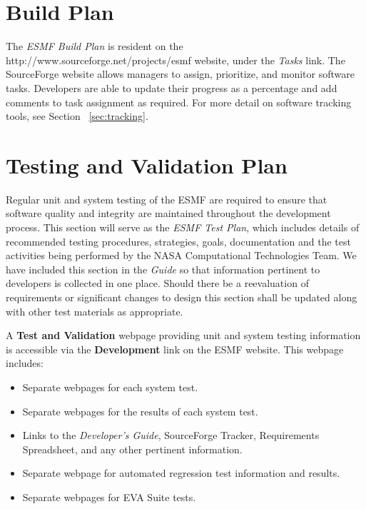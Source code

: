 
\section{Build Plan}
\label{sec:build}

The {\it ESMF Build Plan} is resident on the 
{http://www.sourceforge.net/projects/esmf} website, under the 
{\it Tasks} link. The SourceForge website allows managers to
assign, prioritize, and monitor software tasks. Developers are
able to update their progress as a percentage and add comments to
task assignment as required. For more detail on software
tracking tools, see Section ~\ref{sec:tracking}.

\section{Testing and Validation Plan}
\label{sec:testing}

Regular unit and system testing of the ESMF are required to ensure that 
software quality and integrity are maintained throughout 
the development process.  This section will serve as 
the {\it ESMF Test Plan}, which includes details 
of recommended testing procedures, strategies, goals, documentation 
and the test activities being performed by the NASA Computational 
Technologies Team.
We have included this section in the {\it Guide} 
so that information pertinent to developers is collected in one 
place.  Should there be a reevaluation of requirements or significant 
changes to design this section shall be updated along with other 
test materials as appropriate.

A {\bf Test and Validation} webpage providing unit and system testing 
information is accessible via the {\bf Development} link on the ESMF 
website. This webpage includes:
\begin{itemize}
\item Separate webpages for each system test.
\item Separate webpages for the results of each system test.
\item Links to the {\it Developer's Guide}, SourceForge Tracker, Requirements 
Spreadsheet, and any other pertinent information.
\item Separate webpage for automated regression test information and results.
\item Separate webpages for EVA Suite tests.
\end{itemize}

